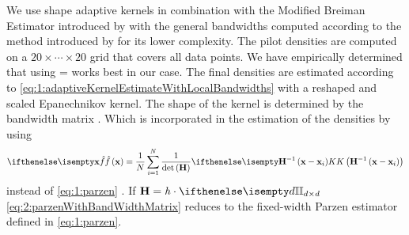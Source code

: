 
	We use shape adaptive kernels in combination with the Modified Breiman Estimator introduced by \textcite{wilkinson1995dataplot} 
	with the general bandwidths computed according to the method introduced by \textcite{ferdosi2011comparison} for its lower complexity.
	The pilot densities are computed on a $20 \times \cdots \times 20$ grid that covers all data points.
	We have empirically determined  that using \varMBESensitivityParam =  works best in our case. 
	The final densities are estimated according to \cref{eq:1:adaptiveKernelEstimateWithLocalBandwidths} with a reshaped and scaled Epanechnikov kernel. The shape of the kernel is determined by the bandwidth matrix \varBandwidthMatrix. Which is incorporated in the estimation of the densities by using 
	\begin{equation}\label{eq:2:parzenWithBandWidthMatrix}
		\varEstimatedDensityFunction{\varPattern} = \frac{1}{\varNumPatterns}\sum_{\itXis = 1}^{\varNumPatterns} \frac{1}{\det\left(\varBandwidthMatrix\right)}\varKernel{\varBandwidthMatrix^{-1}\left(\varPattern - \varPattern[\itXis]\right)}
	\end{equation}
	instead of \cref{eq:1:parzen} \cite{hardle2012nonparametric}. If $\varBandwidthMatrix = \varBandwidth \cdot \identityMatrix{\varDim}$ \cref{eq:2:parzenWithBandWidthMatrix} reduces to the fixed-width Parzen estimator defined in \cref{eq:1:parzen}. 
	
